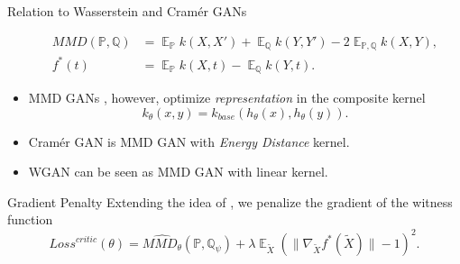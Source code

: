 \documentclass[xcolor={table}]{beamer}
\DeclareMathOperator*{\E}{\mathbb{E}}
\newcommand{\PP}{\mathbb P}
\newcommand{\QQ}{\mathbb Q}
\newcommand{\ZZ}{\mathbb Z}
\begin{document}
\begin{frame}{}
\begin{columns}[T, totalwidth=\textwidth]
\begin{column}{.32\textwidth}
\begin{block}{Relation to Wasserstein and Cram\'er GANs}
\begin{itemize}
{          \begin{align*}
            MMD(\PP, \QQ) &= \E_{\PP} k(X,X') + \E_{\QQ} k(Y,Y') - 2\E_{\PP,\QQ} k(X,Y),\\
            f^*(t) &= \E_{\PP}k(X, t) - \E_{\QQ}k(Y, t).
          \end{align*}
        }
        \item{
          MMD GANs \citep{mmd-gan}, however, 
          optimize \emph{representation} in the composite kernel 
          \[ k_{\theta}(x, y) = k_{base}(h_{\theta}(x), h_{\theta}(y)). \]
        }
        \item Cram\'er GAN is MMD GAN with \emph{Energy Distance} kernel.
        \item WGAN can be seen as MMD GAN with linear kernel.
      \end{itemize}
    \end{block}
    \vspace*{-1.2cm}
    \begin{block}{Gradient Penalty}
      Extending the idea of \citet{wgan-gp}, we penalize the
      gradient of the witness function 
      \[ Loss^{critic}(\theta) = \widehat{MMD_{\theta}}(\PP, \QQ_{\psi}) + \lambda\E_{\tilde{X}}\left(\|\nabla_{\tilde{X}} f^*(\tilde{X})\| - 1\right)^2. \]
    \end{block}
  \end{column}


\end{columns}
\end{frame}
\end{document}
